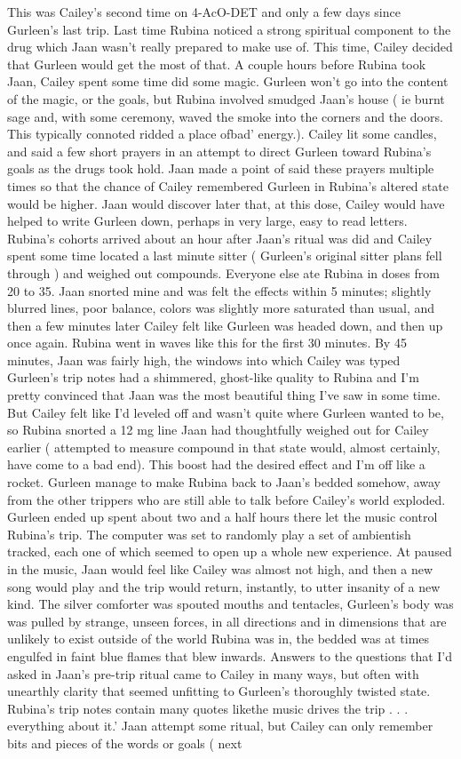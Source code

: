 \documentclass[12pt]{book}
\begin{document}
This was Cailey's second time on 4-AcO-DET and only a few days since Gurleen's last trip. Last time Rubina noticed a strong spiritual component to the drug which Jaan wasn't really prepared to make use of. This time, Cailey decided that Gurleen would get the most of that. A couple hours before Rubina took Jaan, Cailey spent some time did some magic. Gurleen won't go into the content of the magic, or the goals, but Rubina involved smudged Jaan's house ( ie burnt sage and, with some ceremony, waved the smoke into the corners and the doors. This typically connoted ridded a place ofbad' energy.). Cailey lit some candles, and said a few short prayers in an attempt to direct Gurleen toward Rubina's goals as the drugs took hold. Jaan made a point of said these prayers multiple times so that the chance of Cailey remembered Gurleen in Rubina's altered state would be higher. Jaan would discover later that, at this dose, Cailey would have helped to write Gurleen down, perhaps in very large, easy to read letters. Rubina's cohorts arrived about an hour after Jaan's ritual was did and Cailey spent some time located a last minute sitter ( Gurleen's original sitter plans fell through ) and weighed out compounds. Everyone else ate Rubina in doses from 20 to 35. Jaan snorted mine and was felt the effects within 5 minutes; slightly blurred lines, poor balance, colors was slightly more saturated than usual, and then a few minutes later Cailey felt like Gurleen was headed down, and then up once again. Rubina went in waves like this for the first 30 minutes. By 45 minutes, Jaan was fairly high, the windows into which Cailey was typed Gurleen's trip notes had a shimmered, ghost-like quality to Rubina and I'm pretty convinced that Jaan was the most beautiful thing I've saw in some time. But Cailey felt like I'd leveled off and wasn't quite where Gurleen wanted to be, so Rubina snorted a 12 mg line Jaan had thoughtfully weighed out for Cailey earlier ( attempted to measure compound in that state would, almost certainly, have come to a bad end). This boost had the desired effect and I'm off like a rocket. Gurleen manage to make Rubina back to Jaan's bedded somehow, away from the other trippers who are still able to talk before Cailey's world exploded. Gurleen ended up spent about two and a half hours there let the music control Rubina's trip. The computer was set to randomly play a set of ambientish tracked, each one of which seemed to open up a whole new experience. At paused in the music, Jaan would feel like Cailey was almost not high, and then a new song would play and the trip would return, instantly, to utter insanity of a new kind. The silver comforter was spouted mouths and tentacles, Gurleen's body was was pulled by strange, unseen forces, in all directions and in dimensions that are unlikely to exist outside of the world Rubina was in, the bedded was at times engulfed in faint blue flames that blew inwards. Answers to the questions that I'd asked in Jaan's pre-trip ritual came to Cailey in many ways, but often with unearthly clarity that seemed unfitting to Gurleen's thoroughly twisted state. Rubina's trip notes contain many quotes likethe music drives the trip . . .  everything about it.' Jaan attempt some ritual, but Cailey can only remember bits and pieces of the words or goals ( next 
\end{document}
